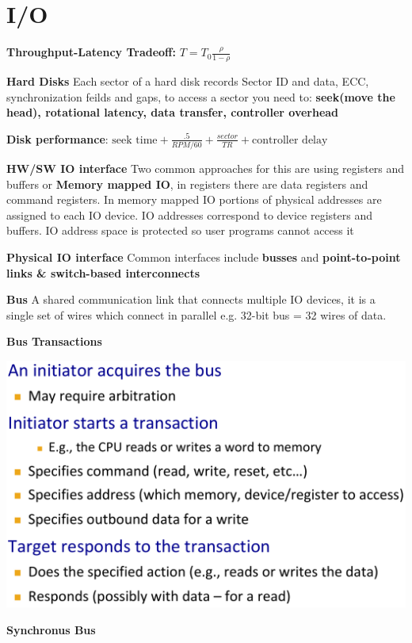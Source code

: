 \section{I/O}

\textbf{Throughput-Latency Tradeoff:} $T = T_0\frac{\rho}{1-\rho}$

\textbf{Hard Disks} Each sector of a hard disk records Sector ID and data, ECC,
synchronization feilds and gaps, to access a sector you need to:
\textbf{seek(move the head), rotational latency, data transfer, controller overhead}

\textbf{Disk performance}:
$\text{seek time}+\frac{.5}{RPM/60}+\frac{sector}{TR}+\text{controller delay}$

\textbf{HW/SW IO interface} Two common approaches for this are using registers and
buffers or \textbf{Memory mapped IO}, in registers there are data registers and
command registers. In memory mapped IO portions of physical addresses are assigned
to each IO device. IO addresses correspond to device registers and buffers. IO
address space is protected so user programs cannot access it

\textbf{Physical IO interface} Common interfaces include \textbf{busses} and
\textbf{point-to-point links \& switch-based interconnects}

\textbf{Bus} A shared communication link that connects multiple IO devices, it is
a single set of wires which connect in parallel e.g. 32-bit bus = 32 wires of data.

\textbf{Bus Transactions}

\includegraphics[width=\linewidth]{png/bustransaction.png}

\textbf{Synchronus Bus}


